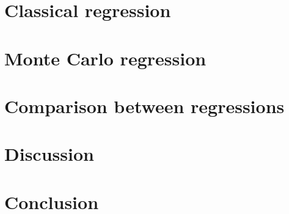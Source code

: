 \documentclass{article}
\begin{document}
	\section{Classical regression}
	\newpage
	\section{Monte Carlo regression}
	\newpage
	\section{Comparison between regressions}
	\newpage
	\section{Discussion}
	\newpage
	\section{Conclusion}
	
\end{document}
